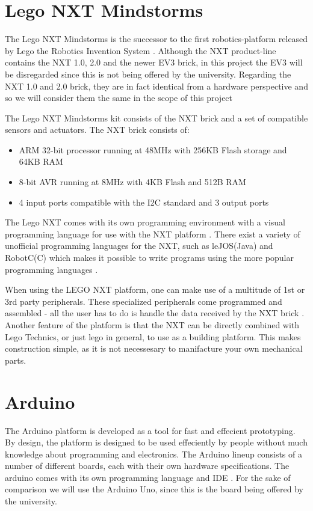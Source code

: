 \section{Lego NXT Mindstorms}
The Lego NXT Mindstorms is the successor to the first robotics-platform released
by Lego the Robotics Invention System \citep{NXTHistory}. Although the NXT
product-line contains the NXT 1.0, 2.0 and the newer EV3 brick, in this project
the EV3 will be disregarded since this is not being offered by the university.
Regarding the NXT 1.0 and 2.0 brick, they are in fact identical from a hardware
perspective and so we will consider them the same in the scope of this project
\citep{NXTversions}\nl

The Lego NXT Mindstorms kit consists of the NXT brick and a set of
compatible sensors and actuators. The NXT brick \citep[P.70]{NXTStats} consists
of:

\begin{itemize}
  \item ARM 32-bit processor running at 48MHz with 256KB Flash storage and 64KB RAM
  \item 8-bit AVR running at 8MHz with 4KB Flash and 512B RAM
  \item 4 input ports compatible with the I2C standard and 3 output ports
\end{itemize}

The Lego NXT comes with its own programming environment with a visual
programming language for use with the NXT platform \cite{NXTG}. There exist a
variety of unofficial programming languages for the NXT, such as leJOS(Java) and
RobotC(C) which makes it possible to write programs using the more popular programming
languages \citep{NXTProgrammingLanguage}.\nl

When using the LEGO NXT platform, one can make use of a multitude of 1st or 3rd
party peripherals. These specialized peripherals come programmed and assembled -
all the user has to do is handle the data received by the NXT brick \Source.
Another feature of the platform is that the NXT can be directly combined with
Lego Technics, or just lego in general, to use as a building platform. This
makes construction simple, as it is not necessesary to manifacture your own
mechanical parts.

\section{Arduino}
The Arduino platform is developed as a tool for fast and effecient prototyping.
By design, the platform is designed to be used effeciently by people without
much knowledge about programming and electronics. The Arduino lineup consists of
a number of different boards, each with their own hardware specifications.
 The arduino comes with its own programming language and IDE
\citep{ArduinoIntro}. For the sake of comparison we will use the Arduino Uno,
since this is the board being offered by the university.\nl

